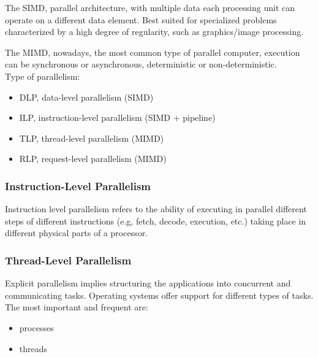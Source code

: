 The SIMD, parallel architecture, with multiple data each processing unit can operate on a different data element.
Best suited for specialized problems characterized by a high degree of regularity, such as graphics/image processing.

The MIMD, nowadays, the most common type of parallel computer, execution can be synchronous or asynchronous,
deterministic or non-deterministic.\\

Type of parallelism:
\begin{itemize}
    \item DLP, data-level parallelism (SIMD)
    \item ILP, instruction-level parallelism (SIMD + pipeline)
    \item TLP, thread-level parallelism (MIMD)
    \item RLP, request-level parallelism (MIMD)
\end{itemize}

\subsubsection{Instruction-Level Parallelism}
Instruction level parallelism refers to the ability of executing in parallel different steps of different instructions
(e.g, fetch, decode, execution, etc.) taking place in different physical parts of a processor.

\subsubsection{Thread-Level Parallelism}
Explicit parallelism implies structuring the applications into concurrent and communicating tasks.
Operating systems offer support for different types of tasks.
The most important and frequent are:
\begin{itemize}
    \item processes
    \item threads
\end{itemize}

